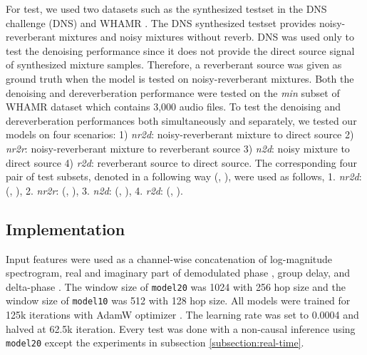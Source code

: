 \documentclass[a4paper]{article}
\begin{document}
For test, we used two datasets such as the synthesized testset in the DNS challenge (DNS) and WHAMR \cite{maciejewski2019whamr}.
The DNS synthesized testset provides noisy-reverberant mixtures and noisy mixtures without reverb.
DNS was used only to test the denoising performance since it does not provide the direct source signal of synthesized mixture samples. 
Therefore, a reverberant source was given as ground truth when the model is tested on noisy-reverberant mixtures.
Both the denoising and dereverberation performance were tested on the \textit{min} subset of WHAMR dataset which contains 3,000 audio files.
To test the denoising and dereverberation performances both simultaneously and separately, we tested our models on four scenarios: 
1) \textit{nr2d}: noisy-reverberant mixture to direct source 2) \textit{nr2r}: noisy-reverberant mixture to reverberant source 3) \textit{n2d}: noisy mixture to direct source 4) \textit{r2d}: reverberant source to direct source.
The corresponding four pair of test subsets, denoted in a following way (, ), were used as follows, 1. \textit{nr2d}: (, ),
2. \textit{nr2r}: (, ), 3. \textit{n2d}: (, ), 4. \textit{r2d}: (, ).

\subsection{Implementation}
Input features were used as a channel-wise concatenation of log-magnitude spectrogram, real and imaginary part of demodulated phase \cite{takahashi2018phasenet}, group delay, and delta-phase \cite{mccowan2011delta}.
The window size of \texttt{model20} was 1024 with 256 hop size and the window size of \texttt{model10} was 512 with 128 hop size.
All models were trained for 125k iterations with AdamW optimizer \cite{reddi2019convergence}. The learning rate was set to 0.0004 and halved at 62.5k iteration.
Every test was done with a non-causal inference using \texttt{model20} except the experiments in subsection \ref{subsection:real-time}.
\end{document}
